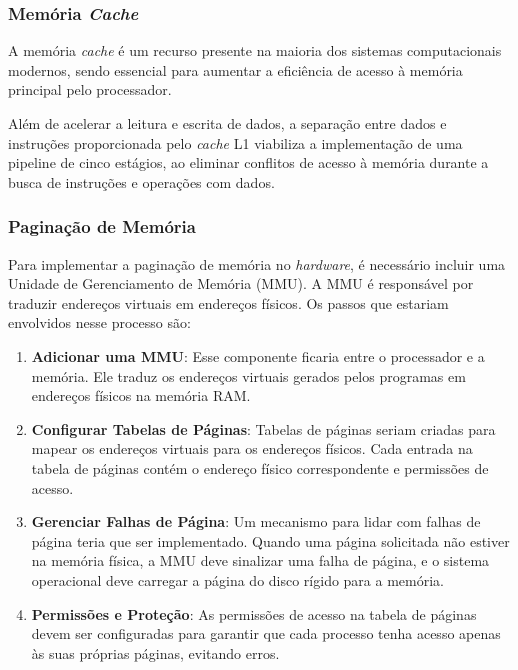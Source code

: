 \documentclass[
	12pt,				%
	openright,			%
	oneside,			%
	a4paper,			%
	english,			%
	french,				%
	spanish,			%
	brazil,				%
	]{abntex2}
\begin{document}
\subsubsection{Memória \textit{Cache}}\label{recursos_cache}%

A memória \textit{cache} é um recurso presente na maioria dos sistemas computacionais modernos, sendo essencial para aumentar a eficiência de acesso à memória principal pelo processador.

Além de acelerar a leitura e escrita de dados, a separação entre dados e instruções proporcionada pelo \textit{cache} L1 viabiliza a implementação de uma pipeline de cinco estágios, ao eliminar conflitos de acesso à memória durante a busca de instruções e operações com dados.

\subsubsection{Paginação de Memória}\label{recursos_mem_pag}%

Para implementar a paginação de memória no \textit{hardware}, é necessário incluir uma Unidade de Gerenciamento de Memória (MMU). A MMU é responsável por traduzir endereços virtuais em endereços físicos. Os passos que estariam envolvidos nesse processo são:

\begin{enumerate}
    \item \textbf{Adicionar uma MMU}: Esse componente ficaria entre o processador e a memória. Ele traduz os endereços virtuais gerados pelos programas em endereços físicos na memória RAM.    
    \item \textbf{Configurar Tabelas de Páginas}: Tabelas de páginas seriam criadas para mapear os endereços virtuais para os endereços físicos. Cada entrada na tabela de páginas contém o endereço físico correspondente e permissões de acesso.    
    \item \textbf{Gerenciar Falhas de Página}: Um mecanismo para lidar com falhas de página teria que ser implementado. Quando uma página solicitada não estiver na memória física, a MMU deve sinalizar uma falha de página, e o sistema operacional deve carregar a página do disco rígido para a memória.    
    \item \textbf{Permissões e Proteção}: As permissões de acesso na tabela de páginas devem ser configuradas para garantir que cada processo tenha acesso apenas às suas próprias páginas, evitando erros.
\end{enumerate}
\end{document}
